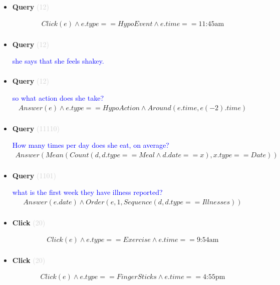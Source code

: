 \documentclass[11pt]{article}
\newcommand{\key}[1]{\textcolor{lightgray}{#1}}
\newcounter{CQuery}
\newcounter{CClick}
\begin{document}
\begin{itemize}
\item
\textbf{Query\theCQuery} \key{(12)} \addtocounter{CQuery}{1}
\textcolor{blue}{  }
\begin{multline*}
Click(e) \wedge e.type == HypoEvent \wedge e.time == \mbox{11:45am} \\ 
\end{multline*}


\item
\textbf{Query\theCQuery} \key{(12)} \addtocounter{CQuery}{1}
\textcolor{blue}{ she says that she feels shakey. }
\begin{multline*}
\end{multline*}


\item
\textbf{Query\theCQuery} \key{(12)} \addtocounter{CQuery}{1}
\textcolor{blue}{ so what action does she take? }
\begin{multline*}
Answer(e) \wedge e.type == HypoAction \wedge Around(e.time, e(-2).time) \\ 
\end{multline*}


\item
\textbf{Query\theCQuery} \key{(11110)} \addtocounter{CQuery}{1}
\textcolor{blue}{ How many times per day does she eat, on average? }
\begin{multline*}
Answer(Mean(Count(d, d.type==Meal \wedge d.date==x), x.type==Date)) \\ 
\end{multline*}


\item
\textbf{Query\theCQuery} \key{(1101)} \addtocounter{CQuery}{1}
\textcolor{blue}{ what is the first week they have illness reported? }
\begin{multline*}
Answer(e.date) \wedge Order(e, 1, Sequence(d, d.type==Illnesses)) \\ 
\end{multline*}


\item
\textbf{Click\theCClick} \key{(20)} \addtocounter{CClick}{1}
\textcolor{blue}{  }
\begin{multline*}
Click(e) \wedge e.type==Exercise \wedge e.time==\mbox{9:54am} \\ 
\end{multline*}


\item
\textbf{Click\theCClick} \key{(20)} \addtocounter{CClick}{1}
\textcolor{blue}{  }
\begin{multline*}
Click(e) \wedge e.type==FingerSticks \wedge e.time==\mbox{4:55pm} \\ 
\end{multline*}



\end{itemize}
\end{document}
